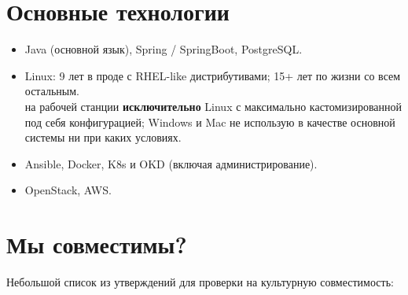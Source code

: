 \documentclass[letterpaper, 11pt]{article}
\begin{document}
    \section{Основные технологии}

    \begin{itemize}
        \item
            Java (основной язык), Spring / SpringBoot, PostgreSQL.
        \item
            Linux: 9 лет в проде с RHEL-like дистрибутивами; 15+ лет по жизни со всем остальным. \\
            \footnotesize
            на рабочей станции \textbf{исключительно} Linux с максимально кастомизированной под себя конфигурацией; Windows и Mac не использую в качестве основной системы ни при каких условиях.
            \normalsize

        \item
            Ansible, Docker, K8s и OKD (включая администрирование).
        \item
            OpenStack, AWS.
    \end{itemize}





    \section{Мы совместимы?}

    Небольшой список из утверждений для проверки на культурную совместимость:

    \renewcommand{\labelitemi}{\checkmark}
\end{document}
